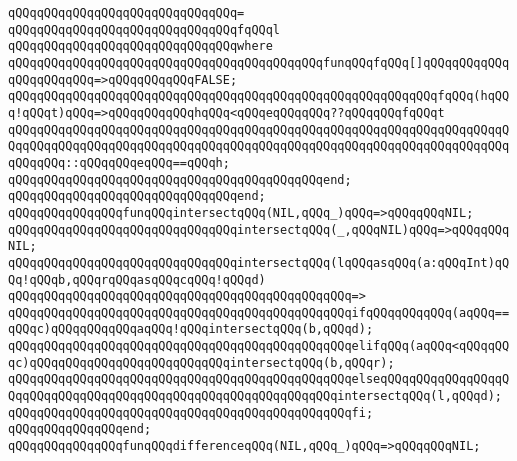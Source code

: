 \verb|qQQqqQQqqQQqqQQqqQQqqQQqqQQqqQQq=|\newline
\verb|qQQqqQQqqQQqqQQqqQQqqQQqqQQqqQQqfqQQql|\newline
\verb|qQQqqQQqqQQqqQQqqQQqqQQqqQQqqQQqwhere|\newline
\verb|qQQqqQQqqQQqqQQqqQQqqQQqqQQqqQQqqQQqqQQqqQQqfunqQQqfqQQq[]qQQqqQQqqQQqqQQqqQQqqQQq=>qQQqqQQqqQQqFALSE;|\newline
\verb|qQQqqQQqqQQqqQQqqQQqqQQqqQQqqQQqqQQqqQQqqQQqqQQqqQQqqQQqqQQqfqQQq(hqQQq!qQQqt)qQQq=>qQQqqQQqqQQqhqQQq<qQQqeqQQqqQQq??qQQqqQQqfqQQqt|\newline
\verb|qQQqqQQqqQQqqQQqqQQqqQQqqQQqqQQqqQQqqQQqqQQqqQQqqQQqqQQqqQQqqQQqqQQqqQQqqQQqqQQqqQQqqQQqqQQqqQQqqQQqqQQqqQQqqQQqqQQqqQQqqQQqqQQqqQQqqQQqqQQqqQQqqQQq::qQQqqQQqeqQQq==qQQqh;|\newline
\verb|qQQqqQQqqQQqqQQqqQQqqQQqqQQqqQQqqQQqqQQqqQQqend;|\newline
\verb|qQQqqQQqqQQqqQQqqQQqqQQqqQQqqQQqend;|\newline
\newline
\newline
\verb|qQQqqQQqqQQqqQQqfunqQQqintersectqQQq(NIL,qQQq_)qQQq=>qQQqqQQqNIL;|\newline
\verb|qQQqqQQqqQQqqQQqqQQqqQQqqQQqqQQqintersectqQQq(_,qQQqNIL)qQQq=>qQQqqQQqNIL;|\newline
\newline
\verb|qQQqqQQqqQQqqQQqqQQqqQQqqQQqqQQqintersectqQQq(lqQQqasqQQq(a:qQQqInt)qQQq!qQQqb,qQQqrqQQqasqQQqcqQQq!qQQqd)|\newline
\verb|qQQqqQQqqQQqqQQqqQQqqQQqqQQqqQQqqQQqqQQqqQQqqQQq=>|\newline
\verb|qQQqqQQqqQQqqQQqqQQqqQQqqQQqqQQqqQQqqQQqqQQqqQQqifqQQqqQQqqQQq(aqQQq==qQQqc)qQQqqQQqqQQqaqQQq!qQQqintersectqQQq(b,qQQqd);|\newline
\verb|qQQqqQQqqQQqqQQqqQQqqQQqqQQqqQQqqQQqqQQqqQQqqQQqelifqQQq(aqQQq<qQQqqQQqc)qQQqqQQqqQQqqQQqqQQqqQQqqQQqintersectqQQq(b,qQQqr);|\newline
\verb|qQQqqQQqqQQqqQQqqQQqqQQqqQQqqQQqqQQqqQQqqQQqqQQqelseqQQqqQQqqQQqqQQqqQQqqQQqqQQqqQQqqQQqqQQqqQQqqQQqqQQqqQQqqQQqqQQqintersectqQQq(l,qQQqd);|\newline
\verb|qQQqqQQqqQQqqQQqqQQqqQQqqQQqqQQqqQQqqQQqqQQqqQQqfi;|\newline
\verb|qQQqqQQqqQQqqQQqend;|\newline
\newline
\newline
\verb|qQQqqQQqqQQqqQQqfunqQQqdifferenceqQQq(NIL,qQQq_)qQQq=>qQQqqQQqNIL;|\newline

